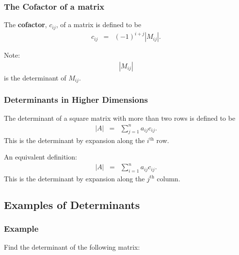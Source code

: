 \begin{frame}
  \frametitle{The Cofactor of a matrix}

  The \textbf{cofactor}, $c_{ij}$, of a matrix is defined to be 
  \begin{eqnarray*}
    c_{ij} & = & (-1)^{i+j}\left| M_{ij} \right|.
  \end{eqnarray*}

  Note:
  \begin{eqnarray*}
    \left| M_{ij} \right|
  \end{eqnarray*}
  is the determinant of $M_{ij}$.

\end{frame}


\begin{frame}
  \frametitle{Determinants in Higher Dimensions}

  The determinant of a square matrix with more than two rows is
  defined to be
  \begin{eqnarray*}
    \left| A \right| & = & \sum^n_{j=1} a_{ij} c_{ij}.
  \end{eqnarray*}
  This is the determinant by expansion along the $i^{\mathrm{th}}$
  row.

  An equivalent definition:
  \begin{eqnarray*}
    \left| A \right| & = & \sum^n_{i=1} a_{ij} c_{ij}.
  \end{eqnarray*}
  This is the determinant by expansion along the $j^{\mathrm{th}}$
  column.

  

\end{frame}


\subsection{Examples of Determinants}

\begin{frame}
  \frametitle{Example}

  Find the determinant of the following matrix:





\end{frame}

